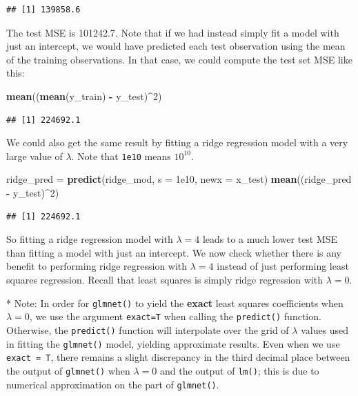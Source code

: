 \documentclass[openany]{book}
\newenvironment{Shaded}{\begin{snugshade}}{\end{snugshade}}
\newcommand{\DataTypeTok}[1]{\textcolor[rgb]{0.13,0.29,0.53}{#1}}
\newcommand{\DecValTok}[1]{\textcolor[rgb]{0.00,0.00,0.81}{#1}}
\newcommand{\FloatTok}[1]{\textcolor[rgb]{0.00,0.00,0.81}{#1}}
\newcommand{\KeywordTok}[1]{\textcolor[rgb]{0.13,0.29,0.53}{\textbf{#1}}}
\newcommand{\NormalTok}[1]{#1}
\newcommand{\OperatorTok}[1]{\textcolor[rgb]{0.81,0.36,0.00}{\textbf{#1}}}
\newcommand{\StringTok}[1]{\textcolor[rgb]{0.31,0.60,0.02}{#1}}
\begin{document}
\begin{verbatim}
## [1] 139858.6
\end{verbatim}

The test MSE is 101242.7. Note that if we had instead simply fit a model
with just an intercept, we would have predicted each test observation using
the mean of the training observations. In that case, we could compute the
test set MSE like this:

\begin{Shaded}
\begin{Highlighting}[]
\KeywordTok{mean}\NormalTok{((}\KeywordTok{mean}\NormalTok{(y_train) }\OperatorTok{-}\StringTok{ }\NormalTok{y_test)}\OperatorTok{^}\DecValTok{2}\NormalTok{)}
\end{Highlighting}
\end{Shaded}

\begin{verbatim}
## [1] 224692.1
\end{verbatim}

We could also get the same result by fitting a ridge regression model with
a very large value of \(\lambda\). Note that \texttt{1e10} means \(10^{10}\).

\begin{Shaded}
\begin{Highlighting}[]
\NormalTok{ridge_pred =}\StringTok{ }\KeywordTok{predict}\NormalTok{(ridge_mod, }\DataTypeTok{s =} \FloatTok{1e10}\NormalTok{, }\DataTypeTok{newx =}\NormalTok{ x_test)}
\KeywordTok{mean}\NormalTok{((ridge_pred }\OperatorTok{-}\StringTok{ }\NormalTok{y_test)}\OperatorTok{^}\DecValTok{2}\NormalTok{)}
\end{Highlighting}
\end{Shaded}

\begin{verbatim}
## [1] 224692.1
\end{verbatim}

So fitting a ridge regression model with \(\lambda = 4\) leads to a much lower test
MSE than fitting a model with just an intercept. We now check whether
there is any benefit to performing ridge regression with \(\lambda = 4\) instead of
just performing least squares regression. Recall that least squares is simply
ridge regression with \(\lambda = 0\).

* Note: In order for \texttt{glmnet()} to yield the \textbf{exact} least squares coefficients when \(\lambda = 0\),
we use the argument \texttt{exact=T} when calling the \texttt{predict()} function. Otherwise, the
\texttt{predict()} function will interpolate over the grid of \(\lambda\) values used in fitting the
\texttt{glmnet()} model, yielding approximate results. Even when we use \texttt{exact\ =\ T}, there remains
a slight discrepancy in the third decimal place between the output of \texttt{glmnet()} when
\(\lambda = 0\) and the output of \texttt{lm()}; this is due to numerical approximation on the part of
\texttt{glmnet()}.
\end{document}
